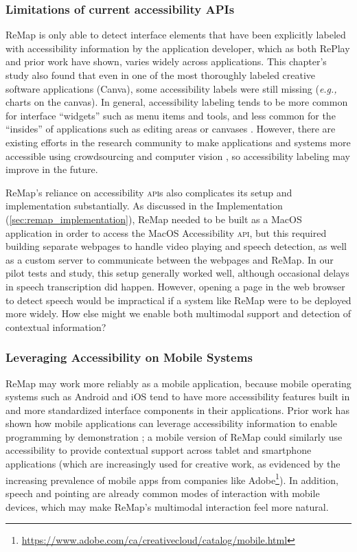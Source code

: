 \subsubsection{Limitations of current accessibility APIs}
ReMap is only able to detect interface elements that have been explicitly labeled with accessibility information by the application developer, which as both RePlay and prior work \cite{Hurst2010, Chang2011} have shown, varies widely across applications. This chapter's study also found that even in one of the most thoroughly labeled creative software applications (Canva), some accessibility labels were still missing (\textit{e.g.,} charts on the canvas). In general, accessibility labeling tends to be more common for interface ``widgets'' such as menu items and tools, and less common for the ``insides'' of applications such as editing areas or canvases \cite{Hurst2010}. However, there are existing efforts in the research community to make applications and systems more accessible using crowdsourcing and computer vision \cite{Guo2016, Guo2019StateLens}, so accessibility labeling may improve in the future.

ReMap's reliance on accessibility \textsc{api}s also complicates its setup and implementation substantially. As discussed in the Implementation (\autoref{sec:remap_implementation}), ReMap needed to be built as a MacOS application in order to access the MacOS Accessibility \textsc{api}, but this required building separate webpages to handle video playing and speech detection, as well as a custom server to communicate between the webpages and ReMap. In our pilot tests and study, this setup generally worked well, although occasional delays in speech transcription did happen. However, opening a page in the web browser to detect speech would be impractical if a system like ReMap were to be deployed more widely. How else might we enable both multimodal support and detection of contextual information?

\subsubsection{Leveraging Accessibility on Mobile Systems}
ReMap may work more reliably as a mobile application, because mobile operating systems such as Android and iOS tend to have more accessibility features built in and more standardized interface components in their applications. Prior work has shown how mobile applications can leverage accessibility information to enable programming by demonstration \cite{Li2017}; a mobile version of ReMap could similarly use accessibility to provide contextual support across tablet and smartphone applications (which are increasingly used for creative work, as evidenced by the increasing prevalence of mobile apps from companies like Adobe\footnote{\url{https://www.adobe.com/ca/creativecloud/catalog/mobile.html}}). In addition, speech and pointing are already common modes of interaction with mobile devices, which may make ReMap's multimodal interaction feel more natural. 

